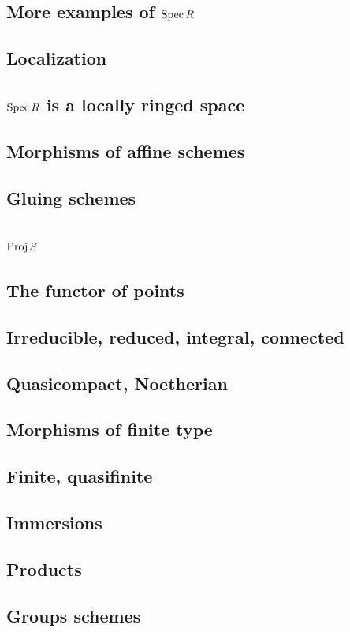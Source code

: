 \documentclass [11 pt, oneside, margin = 1 in] {article}
\begin{document}
\subsection{More examples of $\operatorname{Spec} R$}
\subsection{Localization}
\subsection{$\operatorname{Spec} R$ is a locally ringed space}
\subsection{Morphisms of affine schemes}
\subsection{Gluing schemes}
\subsection{$\operatorname{Proj} S$}
\subsection{The functor of points}
\subsection{Irreducible, reduced, integral, connected}
\subsection{Quasicompact, Noetherian}
\subsection{Morphisms of finite type}
\subsection{Finite, quasifinite}
\subsection{Immersions}
\subsection{Products}
\subsection{Groups schemes}
\end{document}
